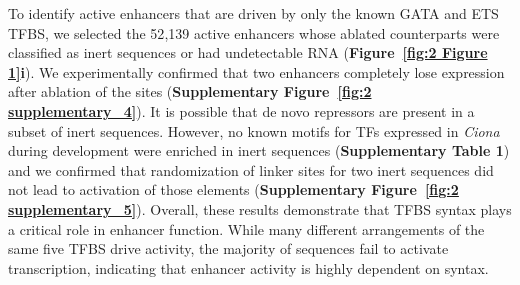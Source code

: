 To identify active enhancers that are driven by only the known GATA and ETS TFBS, we selected the 52{,}139 active enhancers whose ablated counterparts were classified as inert sequences or had undetectable RNA (\textbf{Figure~\ref{fig:2 Figure 1}i}). We experimentally confirmed that two enhancers completely lose expression after ablation of the sites (\textbf{Supplementary Figure~\ref{fig:2 supplementary_4}}). It is possible that de novo repressors are present in a subset of inert sequences. However, no known motifs for TFs expressed in \textit{Ciona} during development were enriched in inert sequences (\textbf{Supplementary Table 1}) and we confirmed that randomization of linker sites for two inert sequences did not lead to activation of those elements (\textbf{Supplementary Figure~\ref{fig:2 supplementary_5}}). Overall, these results demonstrate that TFBS syntax plays a critical role in enhancer function. While many different arrangements of the same five TFBS drive activity, the majority of sequences fail to activate transcription, indicating that enhancer activity is highly dependent on syntax.

\clearpage

